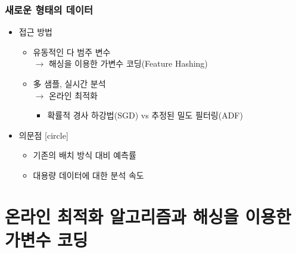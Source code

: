 \documentclass{beamer}
\begin{document}
\begin{frame}
\frametitle{새로운 형태의 데이터}

\begin{itemize}
\item 접근 방법
    \begin{itemize}
    [circle]
    \item 유동적인 다 범주 변수\\
        $\rightarrow$ 해싱을 이용한 가변수 코딩(Feature Hashing)

    \item 多  샘플, 실시간 분석\\
        $\rightarrow$ 온라인 최적화
        \begin{itemize}
        [triangle]
        \item 확률적 경사 하강법(SGD) vs 추정된 밀도 필터링(ADF)
        \end{itemize}

    \end{itemize}

\item 의문점
    [circle]
    \begin{itemize}
    \item 기존의 배치 방식 대비 예측률
    \item 대용량 데이터에 대한 분석 속도
    \end{itemize}

\end{itemize}
\end{frame}





\section{온라인 최적화 알고리즘과 해싱을 이용한 가변수 코딩} %
\end{document}
